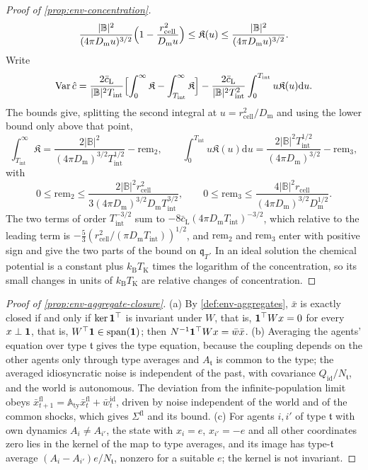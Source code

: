 \begin{proof}[Proof of \cref{prop:env-concentration}]
\[
\frac{\lvert\mathbb B\rvert^2}{(4\pi D_{\mathrm m}u)^{3/2}}\Bigl(1-\frac{r_{\mathrm{cell}}^2}{D_{\mathrm m}u}\Bigr)\le\mathfrak K(u)\le\frac{\lvert\mathbb B\rvert^2}{(4\pi D_{\mathrm m}u)^{3/2}}.
\]
Write
\[
\operatorname{Var}\hat c=\frac{2\bar c_{\mathrm L}}{\lvert\mathbb B\rvert^2T_{\mathrm{int}}}\Bigl[\int_0^\infty\mathfrak K-\int_{T_{\mathrm{int}}}^\infty\mathfrak K\Bigr]-\frac{2\bar c_{\mathrm L}}{\lvert\mathbb B\rvert^2T_{\mathrm{int}}^2}\int_0^{T_{\mathrm{int}}}u\mathfrak K(u)\mathrm du.
\]
The bounds give, splitting the second integral at $u=r_{\mathrm{cell}}^2/D_{\mathrm m}$ and using the lower bound only above that point,
\[
\int_{T_{\mathrm{int}}}^\infty\mathfrak K=\frac{2\lvert\mathbb B\rvert^2}{(4\pi D_{\mathrm m})^{3/2}T_{\mathrm{int}}^{1/2}}-\mathrm{rem}_2,\qquad\int_0^{T_{\mathrm{int}}}u\mathfrak K(u)\mathrm du=\frac{2\lvert\mathbb B\rvert^2T_{\mathrm{int}}^{1/2}}{(4\pi D_{\mathrm m})^{3/2}}-\mathrm{rem}_3,
\]
with
\[
0\le\mathrm{rem}_2\le\frac{2\lvert\mathbb B\rvert^2r_{\mathrm{cell}}^2}{3(4\pi D_{\mathrm m})^{3/2}D_{\mathrm m}T_{\mathrm{int}}^{3/2}},\qquad0\le\mathrm{rem}_3\le\frac{4\lvert\mathbb B\rvert^2r_{\mathrm{cell}}}{(4\pi D_{\mathrm m})^{3/2}D_{\mathrm m}^{1/2}}.
\]
The two terms of order $T_{\mathrm{int}}^{-3/2}$ sum to $-8\bar c_{\mathrm L}(4\pi D_{\mathrm m}T_{\mathrm{int}})^{-3/2}$, which relative to the leading term is $-\frac53(r_{\mathrm{cell}}^2/(\pi D_{\mathrm m}T_{\mathrm{int}}))^{1/2}$, and $\mathrm{rem}_2$ and $\mathrm{rem}_3$ enter with positive sign and give the two parts of the bound on $\mathfrak q_T$. In an ideal solution the chemical potential is a constant plus $k_{\mathrm B}T_{\mathrm K}$ times the logarithm of the concentration, so its small changes in units of $k_{\mathrm B}T_{\mathrm K}$ are relative changes of concentration.
\end{proof}

\begin{proof}[Proof of \cref{prop:env-aggregate-closure}]
(a) By \cref{def:env-aggregates}, $\bar x$ is exactly closed if and only if $\ker\mathbf{1}^\top$ is invariant under $W$, that is, $\mathbf{1}^\top Wx=0$ for every $x\perp\mathbf{1}$, that is, $W^\top\mathbf{1}\in\operatorname{span}(\mathbf{1})$; then $N^{-1}\mathbf{1}^\top Wx=\bar w\bar x$. (b) Averaging the agents' equation over type $\mathfrak t$ gives the type equation, because the coupling depends on the other agents only through type averages and $A_{\mathfrak t}$ is common to the type; the averaged idiosyncratic noise is independent of the past, with covariance $Q_{\mathrm{id}}/N_{\mathfrak t}$, and the world is autonomous. The deviation from the infinite-population limit obeys $\bar x^{\mathrm{fl}}_{t+1}=\mathbb A_{\mathrm{ty}}\bar x^{\mathrm{fl}}_t+\bar w^{\mathrm{id}}_t$, driven by noise independent of the world and of the common shocks, which gives $\Sigma^{\mathrm{fl}}$ and its bound. (c) For agents $i,i'$ of type $\mathfrak t$ with own dynamics $A_i\ne A_{i'}$, the state with $x_i=e$, $x_{i'}=-e$ and all other coordinates zero lies in the kernel of the map to type averages, and its image has type-$\mathfrak t$ average $(A_i-A_{i'})e/N_{\mathfrak t}$, nonzero for a suitable $e$; the kernel is not invariant.
\end{proof}

